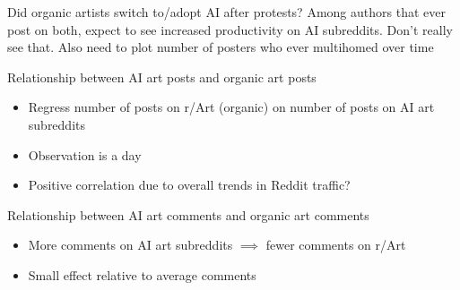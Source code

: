 \documentclass[aspectratio=169]{beamer}
\begin{document}
\begin{frame}{Did organic artists switch to/adopt AI after protests?}
	Among authors that ever post on both,
	expect to see increased productivity on AI subreddits.
	Don't really see that.
	Also need to plot number of posters who ever multihomed over time
\end{frame}

\begin{frame}{Relationship between AI art posts and organic art posts}
	\centering
	\begin{itemize}
		\item Regress number of posts on r/Art (organic) on number of posts on AI art subreddits
		\item Observation is a day
		\item Positive correlation due to overall trends in Reddit traffic?
	\end{itemize}
\end{frame}

\begin{frame}{Relationship between AI art comments and organic art comments}
	\centering
	\begin{itemize}
		\item More comments on AI art subreddits $\implies$ fewer comments on r/Art
		\item Small effect relative to average comments
	\end{itemize}
\end{frame}
\end{document}

